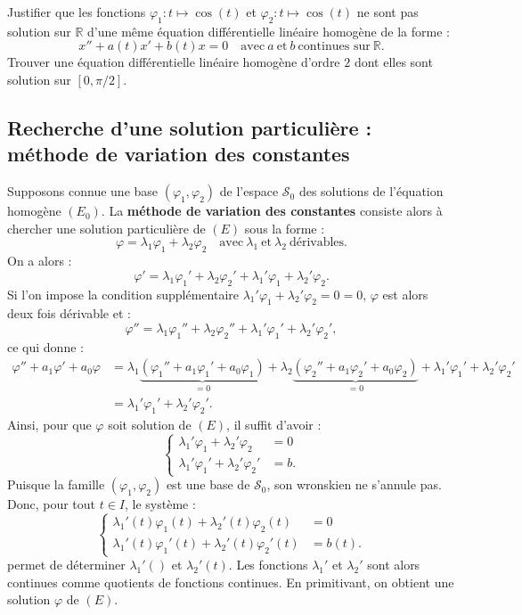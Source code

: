 \documentclass[french]{article}
\newcommand{\R}{\mathbb{R}}
\theoremstyle{plain}
\theoremstyle{definition}
\theoremstyle{remark}
\begin{document}
\begin{exo}
	Justifier que les fonctions $\varphi_1:t\mapsto\cos(t)$ et $\varphi_2:t\mapsto\cos(t)$ ne sont pas solution sur $\R$ d'une même équation différentielle linéaire homogène de la forme :
	$$x''+a(t)x'+b(t)x=0\quad \text{avec}\ a\ \text{et}\ b\ \text{continues sur}\ \R.$$
	Trouver une équation différentielle linéaire homogène d'ordre $2$ dont elles sont solution sur $[0,\pi/2]$.
\end{exo}

\subsection{Recherche d'une solution particulière : méthode de variation des constantes}

Supposons connue une base $(\varphi_1,\varphi_2)$ de l'espace $\mathcal{S}_0$ des solutions de l'équation homogène $(E_0)$. La \textbf{méthode de variation des constantes} consiste alors à chercher une solution particulière de $(E)$ sous la forme :
$$\varphi=\lambda_1\varphi_1+\lambda_2\varphi_2\quad\text{avec}\ \lambda_1\ \text{et}\ \lambda_2\ \text{dérivables}.$$
On a alors :
$$\varphi'=\lambda_1\varphi_1'+\lambda_2\varphi_2'+\lambda_1'\varphi_1+\lambda_2'\varphi_2.$$
Si l'on impose la condition supplémentaire $\lambda_1'\varphi_1+\lambda_2'\varphi_2=0=0$, $\varphi$ est alors deux fois dérivable et :
$$\varphi''=\lambda_1\varphi_1''+\lambda_2\varphi_2''+\lambda_1'\varphi_1'+\lambda_2'\varphi_2',$$ ce qui donne :
\begin{align*}
	\varphi''+a_1\varphi'+a_0\varphi&=\lambda_1\underbrace{(\varphi_1''+a_1\varphi_1'+a_0\varphi_1)}_{=0}+\lambda_2\underbrace{(\varphi_2''+a_1\varphi_2'+a_0\varphi_2)}_{=0}+\lambda_1'\varphi_1'+\lambda_2'\varphi_2'\\
	&=\lambda_1'\varphi_1'+\lambda_2'\varphi_2'.
\end{align*}
Ainsi, pour que $\varphi$ soit solution de $(E)$, il suffit d'avoir :
$$\begin{cases}
	\lambda_1'\varphi_1+\lambda_2'\varphi_2&=0\\
	\lambda_1'\varphi_1'+\lambda_2'\varphi_2'&=b.
\end{cases}$$
Puisque la famille $(\varphi_1,\varphi_2)$ est une base de $\mathcal{S}_0$, son wronskien ne s'annule pas. Donc, pour tout $t\in I$, le système :
$$\begin{cases}
	\lambda_1'(t)\varphi_1(t)+\lambda_2'(t)\varphi_2(t)&=0\\
	\lambda_1'(t)\varphi_1'(t)+\lambda_2'(t)\varphi_2'(t)&=b(t).
\end{cases}$$
permet de déterminer $\lambda_1'()$ et $\lambda_2'(t)$. Les fonctions $\lambda_1'$ et $\lambda_2'$ sont alors continues comme quotients de fonctions continues. En primitivant, on obtient une solution $\varphi$ de $(E)$.
\end{document}

